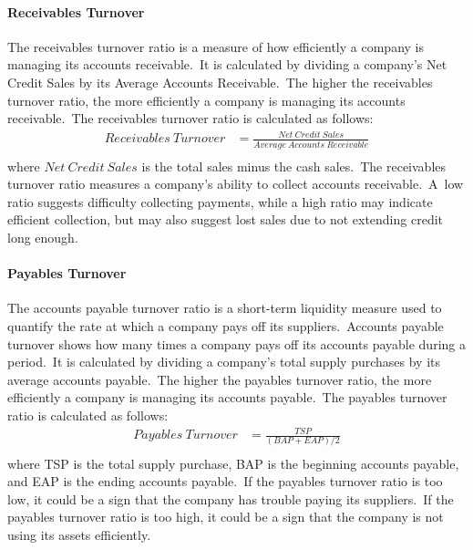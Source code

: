 \documentclass[../xlapes02]{subfiles}
\begin{document}
    \paragraph{Receivables Turnover}\label{par:receivables-turnover}
    The receivables turnover ratio is a measure of how efficiently a company is managing its accounts receivable.\ It is calculated by dividing a company's Net Credit Sales by its Average Accounts Receivable.\ The higher the receivables turnover ratio, the more efficiently a company is managing its accounts receivable.\ The receivables turnover ratio is calculated as follows:
    \begin{equation}
        \label{eq:receivables-turnover}
        \begin{split}
            Receivables\ Turnover&=\frac{Net\ Credit\ Sales}{Average\ Accounts\ Receivable}\\
        \end{split}
    \end{equation}
    where $Net\ Credit\ Sales$ is the total sales minus the cash sales.\ The receivables turnover ratio measures a company's ability to collect accounts receivable.\ A~low ratio suggests difficulty collecting payments, while a high ratio may indicate efficient collection, but may also suggest lost sales due to not extending credit long enough.

    \paragraph{Payables Turnover}\label{par:payables-turnover}
    The accounts payable turnover ratio is a short-term liquidity measure used to quantify the rate at which a company pays off its suppliers.\ Accounts payable turnover shows how many times a company pays off its accounts payable during a period.\ It is calculated by dividing a company's total supply purchases by its average accounts payable.\ The higher the payables turnover ratio, the more efficiently a company is managing its accounts payable.\ The payables turnover ratio is calculated as follows:
    \begin{equation}
        \label{eq:payables-turnover}
        \begin{split}
            Payables\ Turnover&=\frac{TSP}{(BAP+EAP)/2}\\
        \end{split}
    \end{equation}
    where TSP is the total supply purchase, BAP is the beginning accounts payable, and EAP is the ending accounts payable.\ If the payables turnover ratio is too low, it could be a sign that the company has trouble paying its suppliers.\ If the payables turnover ratio is too high, it could be a sign that the company is not using its assets efficiently.
\end{document}
